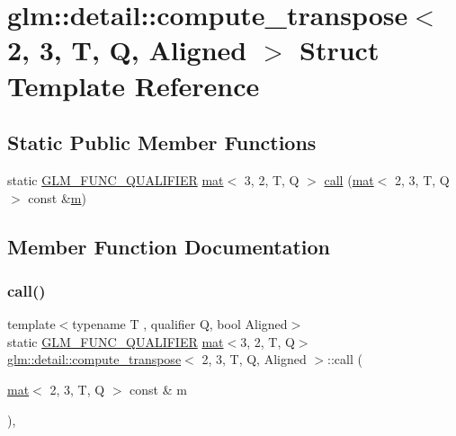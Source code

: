 \hypertarget{structglm_1_1detail_1_1compute__transpose_3_012_00_013_00_01_t_00_01_q_00_01_aligned_01_4}{}\section{glm\+:\+:detail\+:\+:compute\+\_\+transpose$<$ 2, 3, T, Q, Aligned $>$ Struct Template Reference}
\label{structglm_1_1detail_1_1compute__transpose_3_012_00_013_00_01_t_00_01_q_00_01_aligned_01_4}
\subsection*{Static Public Member Functions}
\begin{DoxyCompactItemize}
\item 
static \mbox{\hyperlink{setup_8hpp_a33fdea6f91c5f834105f7415e2a64407}{G\+L\+M\+\_\+\+F\+U\+N\+C\+\_\+\+Q\+U\+A\+L\+I\+F\+I\+ER}} \mbox{\hyperlink{structglm_1_1mat}{mat}}$<$ 3, 2, T, Q $>$ \mbox{\hyperlink{structglm_1_1detail_1_1compute__transpose_3_012_00_013_00_01_t_00_01_q_00_01_aligned_01_4_a912a7588f6a6c2d499abd7df847096b6}{call}} (\mbox{\hyperlink{structglm_1_1mat}{mat}}$<$ 2, 3, T, Q $>$ const \&\mbox{\hyperlink{_s_d_l__opengl__glext_8h_af593500c283bf1a787a6f947f503a5c2}{m}})
\end{DoxyCompactItemize}


\subsection{Member Function Documentation}
\mbox{\label{structglm_1_1detail_1_1compute__transpose_3_012_00_013_00_01_t_00_01_q_00_01_aligned_01_4_a912a7588f6a6c2d499abd7df847096b6}} 
\subsubsection{\texorpdfstring{call()}{call()}}
{\footnotesize\ttfamily template$<$typename T , qualifier Q, bool Aligned$>$ \\
static \mbox{\hyperlink{setup_8hpp_a33fdea6f91c5f834105f7415e2a64407}{G\+L\+M\+\_\+\+F\+U\+N\+C\+\_\+\+Q\+U\+A\+L\+I\+F\+I\+ER}} \mbox{\hyperlink{structglm_1_1mat}{mat}}$<$3, 2, T, Q$>$ \mbox{\hyperlink{structglm_1_1detail_1_1compute__transpose}{glm\+::detail\+::compute\+\_\+transpose}}$<$ 2, 3, T, Q, Aligned $>$\+::call (\begin{DoxyParamCaption}\item[{\mbox{\hyperlink{structglm_1_1mat}{mat}}$<$ 2, 3, T, Q $>$ const \&}]{m }\end{DoxyParamCaption})\hspace{0.3cm}{\ttfamily [inline]}, {\ttfamily [static]}}



